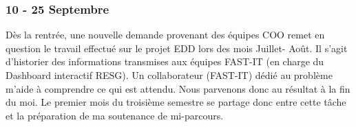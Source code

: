 \subsubsection*{10 - 25 Septembre}
Dès la rentrée, une nouvelle demande provenant des équipes COO remet en question le travail effectué sur le projet EDD lors des mois Juillet- Août. Il s’agit d’historier des informations transmises aux équipes FAST-IT (en charge du Dashboard interactif RESG). Un collaborateur (FAST-IT) dédié au problème m’aide à comprendre ce qui est attendu. Nous parvenons donc au résultat à la fin du moi. Le premier mois du troisième semestre se partage donc entre cette tâche et la préparation de ma soutenance de mi-parcours.  